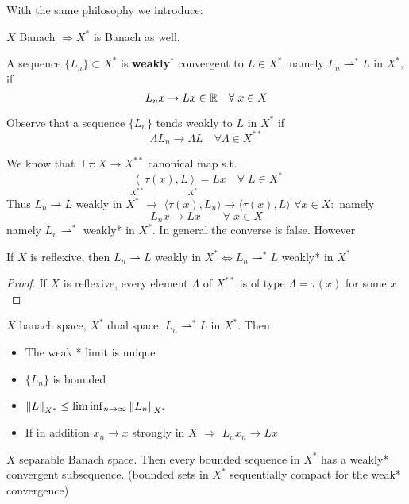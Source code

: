 With the same philosophy we introduce: 
\begin{definition}
    \(X \) Banach \(\Rightarrow X^* \) is Banach as well.
\end{definition}
\begin{definition}
    A sequence \(\{L_n \} \subset X^*\) is \textbf{weakly\(^*\)} convergent to \(L \in  X^*\), namely \(L_n {\rightharpoonup}^* L\) in \(X^*\), if 
    \[
        L_n x \to Lx \in \mathbb{R} \quad \forall\; x \in X
    \]
\end{definition}
\begin{remark}
    Observe that a sequence \(\{L_n\} \) tends weakly to \(L\) in \(X^*\) if 
    \[
        \Lambda L_n \to \Lambda L \quad \forall \Lambda \in X^{**}
    \]
\end{remark}
We know that \(\exists \; \tau:X \to X^{**}\) canonical map s.t. 
\[
    \underset{X^{**}}{\langle}\tau(x), L \underset{X^*}{\rangle} = Lx \quad \forall \; L \in X^*
\]
Thus \(L_n \rightharpoonup L\) weakly in \(X^*\) \(\rightarrow\) \(\langle \tau(x), L_n \rangle \to \langle \tau(x), L \rangle\) \(\forall x \in X:\) namely
\[
    L_n x \to Lx \qquad \forall \; x \in X
\]
namely \(L_n\rightharpoonup^*\) weakly* in \(X^*\). In general the converse is false. However
\begin{proposition}
    If \(X\) is reflexive, then \(L_n \rightharpoonup L\) weakly in \(X^* \Leftrightarrow L_n \rightharpoonup^* L\) weakly* in \(X^*\)
\end{proposition}
\begin{proof}
    If \(X\) is reflexive, every element \(\Lambda\) of \(X^{**}\) is of type \(\Lambda = \tau(x)\) for some \(x\)
\end{proof}
\begin{proposition}
    \(X\) banach space, \(X^*\) dual space, \(L_n\rightharpoonup^* L\) in \(X^*\). Then
    \begin{itemize}
        \item The weak * limit is unique
        \item \(\{L_n\}\) is bounded
        \item \(\norm{L}_{X^*} \leq \liminf _{n \to \infty} \norm{L_n}_{X^*}\)
        \item If in addition \(x_n \to x\) strongly in \(X\) \(\Rightarrow\) \(L_nx_n \to Lx\) 
    \end{itemize}
\end{proposition}

\begin{theorem}
    \(X \) separable Banach space. Then every bounded sequence in \(X^*\) has a weakly* convergent subsequence. (bounded sets in \(X^* \) sequentially compact for the weak* convergence)
\end{theorem}

